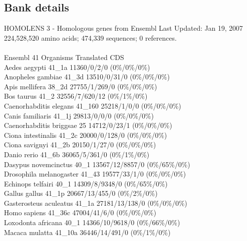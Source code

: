 \documentclass{article}
\begin{document}
\begin{Schunk}
\subsection{Bank details}
HOMOLENS 3 - Homologous genes from Ensembl Last Updated: Jan 19, 2007\\
224,528,520 amino acids; 474,339 sequences; 0 references.\\
\\
Ensembl 41 Organisms Translated CDS\\
Aedes aegypti                           41\_1a 11360/0/2/0 (0\%/0\%/0\%)\\
Anopheles gambiae                       41\_3d 13510/0/31/0 (0\%/0\%/0\%)\\
Apis mellifera                          38\_2d 27755/1/269/0 (0\%/0\%/0\%)\\
Bos taurus                              41\_2 32556/7/620/12 (0\%/1\%/0\%)\\
Caenorhabditis elegans                  41\_160 25218/1/0/0 (0\%/0\%/0\%)\\
Canis familiaris                        41\_1j 29813/0/0/0 (0\%/0\%/0\%)\\
Caenorhabditis briggsae                 25 14712/0/23/1 (0\%/0\%/0\%)\\
Ciona intestinalis                      41\_2c 20000/0/128/0 (0\%/0\%/0\%)\\
Ciona savignyi                          41\_2b 20150/1/27/0 (0\%/0\%/0\%)\\
Danio rerio                             41\_6b 36065/5/361/0 (0\%/1\%/0\%)\\
Dasypus novemcinctus                    40\_1 13567/12/8857/0 (0\%/65\%/0\%)\\
Drosophila melanogaster                 41\_43 19577/33/1/0 (0\%/0\%/0\%)\\
Echinops telfairi                       40\_1 14309/8/9348/0 (0\%/65\%/0\%)\\
Gallus gallus                           41\_1p 20667/13/455/0 (0\%/2\%/0\%)\\
Gasterosteus aculeatus                  41\_1a 27181/13/138/0 (0\%/0\%/0\%)\\
Homo sapiens                            41\_36c 47004/41/6/0 (0\%/0\%/0\%)\\
Loxodonta africana                      40\_1 14366/10/9618/0 (0\%/66\%/0\%)\\
Macaca mulatta                          41\_10a 36446/14/491/0 (0\%/1\%/0\%)\\

\end{Schunk}
\end{document}
